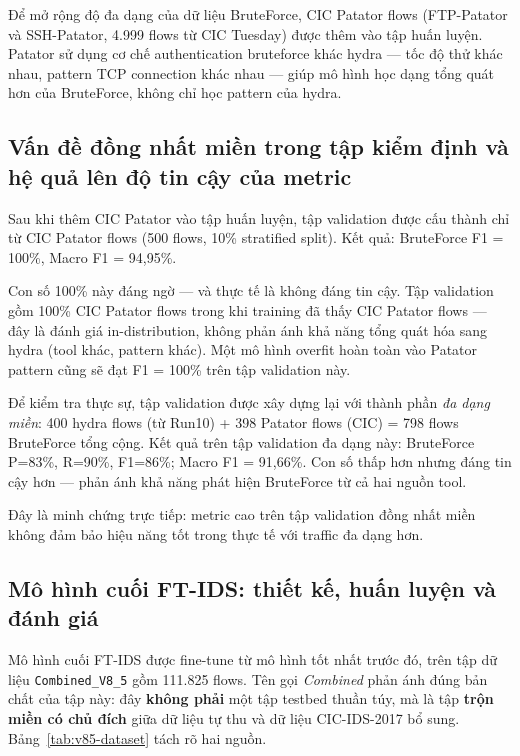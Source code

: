 \documentclass[../DoAn.tex]{subfiles}
\begin{document}
Để mở rộng độ đa dạng của dữ liệu BruteForce, CIC Patator flows (FTP-Patator và SSH-Patator, 4.999 flows từ CIC Tuesday) được thêm vào tập huấn luyện. Patator sử dụng cơ chế authentication bruteforce khác hydra --- tốc độ thử khác nhau, pattern TCP connection khác nhau --- giúp mô hình học dạng tổng quát hơn của BruteForce, không chỉ học pattern của hydra.

\subsection{Vấn đề đồng nhất miền trong tập kiểm định và hệ quả lên độ tin cậy của metric}
\label{subsec:gd4-val-diversity}

Sau khi thêm CIC Patator vào tập huấn luyện, tập validation được cấu thành chỉ từ CIC Patator flows (500 flows, 10\% stratified split). Kết quả: BruteForce F1 = 100\%, Macro F1 = 94,95\%.

Con số 100\% này đáng ngờ --- và thực tế là không đáng tin cậy. Tập validation gồm 100\% CIC Patator flows trong khi training đã thấy CIC Patator flows --- đây là đánh giá in-distribution, không phản ánh khả năng tổng quát hóa sang hydra (tool khác, pattern khác). Một mô hình overfit hoàn toàn vào Patator pattern cũng sẽ đạt F1 = 100\% trên tập validation này.

Để kiểm tra thực sự, tập validation được xây dựng lại với thành phần \textit{đa dạng miền}: 400 hydra flows (từ Run10) + 398 Patator flows (CIC) = 798 flows BruteForce tổng cộng. Kết quả trên tập validation đa dạng này: BruteForce P=83\%, R=90\%, F1=86\%; Macro F1 = 91,66\%. Con số thấp hơn nhưng đáng tin cậy hơn --- phản ánh khả năng phát hiện BruteForce từ cả hai nguồn tool.

Đây là minh chứng trực tiếp: metric cao trên tập validation đồng nhất miền không đảm bảo hiệu năng tốt trong thực tế với traffic đa dạng hơn.

\subsection{Mô hình cuối FT-IDS: thiết kế, huấn luyện và đánh giá}
\label{subsec:gd4-final}

Mô hình cuối FT-IDS được fine-tune từ mô hình tốt nhất trước đó, trên tập dữ liệu \texttt{Combined\_V8\_5} gồm 111.825 flows. Tên gọi \textit{Combined} phản ánh đúng bản chất của tập này: đây \textbf{không phải} một tập testbed thuần túy, mà là tập \textbf{trộn miền có chủ đích} giữa dữ liệu tự thu và dữ liệu CIC-IDS-2017 bổ sung. Bảng~\ref{tab:v85-dataset} tách rõ hai nguồn.
\end{document}
